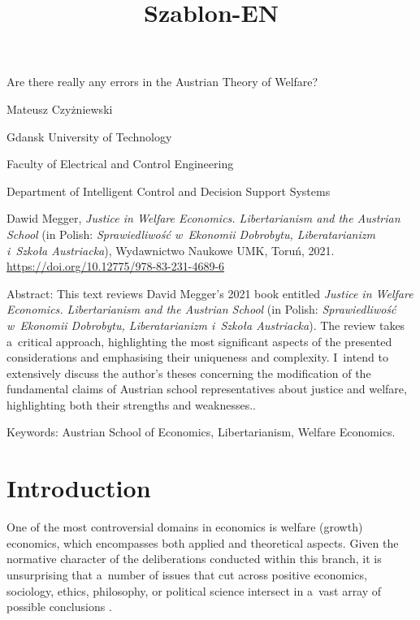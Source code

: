 \setcounter{secnumdepth}{2}





\title{Szablon-EN}



Are there really any errors in the Austrian Theory of Welfare?





Mateusz Czyżniewski



Gdansk University of Technology



Faculty of Electrical and Control Engineering



Department of Intelligent Control and Decision Support Systems



Dawid Megger, \textit{Justice in Welfare Economics. Libertarianism and the Austrian School} (in Polish: \textit{Sprawiedliwość w~Ekonomii Dobrobytu, Liberatarianizm i~Szkoła Austriacka}), Wydawnictwo Naukowe UMK, Toruń, 2021. \url{https://doi.org/10.12775/978-83-231-4689-6}



Abstract: This text reviews David Megger's 2021 book entitled \textit{Justice in Welfare Economics. Libertarianism and the Austrian School} (in Polish: \textit{Sprawiedliwość w~Ekonomii Dobrobytu, Liberatarianizm i~Szkoła Austriacka}). The review takes a~critical approach, highlighting the most significant aspects of the presented considerations and emphasising their uniqueness and complexity. I~intend to extensively discuss the author's theses concerning the modification of the fundamental claims of Austrian school representatives about justice and welfare, highlighting both their strengths and weaknesses..



Keywords: Austrian School of Economics, Libertarianism, Welfare Economics.



\section{Introduction}

One of the most controversial domains in economics is welfare (growth) economics, which encompasses both applied and theoretical aspects. Given the normative character of the deliberations conducted within this branch, it is unsurprising that a~number of issues that cut across positive economics, sociology, ethics, philosophy, or political science intersect in a~vast array of possible conclusions 
\parencite[][]{davis_positive-normative_1998}.%




